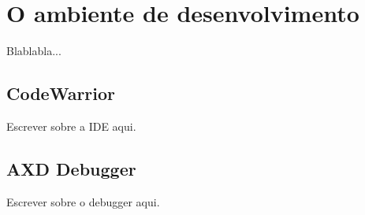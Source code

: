 %
%

\section{O ambiente de desenvolvimento} \label{sec:conceitos_ambientedesenv}

Blablabla...

\subsection{CodeWarrior}

Escrever sobre a IDE aqui.

\subsection{AXD Debugger}

Escrever sobre o debugger aqui.

